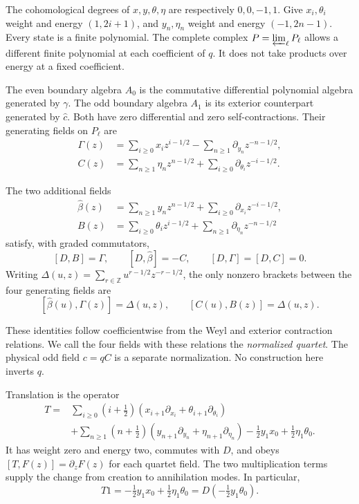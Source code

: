 The cohomological degrees of $x,y,\theta,\eta$ are respectively
$0,0,-1,1$. Give $x_i,\theta_i$ weight and energy
$(1,2i+1)$, and $y_n,\eta_n$ weight and energy $(-1,2n-1)$.
Every state is a finite polynomial. The complete complex
$P=\varprojlim_\ell P_\ell$ allows a different finite polynomial
at each coefficient of $q$. It does not take products over
energy at a fixed coefficient.

The even boundary algebra $A_0$ is the commutative differential
polynomial algebra generated by $\gamma$. The odd boundary
algebra $A_1$ is its exterior counterpart generated by
$\widehat c$. Both have zero differential and zero
self-contractions. Their generating fields on $P_\ell$ are
\begin{align*}
 \Gamma(z)&=\sum_{i\geq0}x_i z^{i-1/2}
                   -\sum_{n\geq1}\partial_{y_n}z^{-n-1/2},\\
 C(z)&=\sum_{n\geq1}\eta_n z^{n-1/2}
                   +\sum_{i\geq0}\partial_{\theta_i}z^{-i-1/2}.
\end{align*}

The two additional fields
\begin{align*}
 \widehat\beta(z)&=\sum_{n\geq1}y_n z^{n-1/2}
                   +\sum_{i\geq0}\partial_{x_i}z^{-i-1/2},\\
 B(z)&=\sum_{i\geq0}\theta_i z^{i-1/2}
                   +\sum_{n\geq1}\partial_{\eta_n}z^{-n-1/2}
\end{align*}
satisfy, with graded commutators,
\[
 [D,B]=\Gamma,\qquad [D,\widehat\beta]=-C,
 \qquad [D,\Gamma]=[D,C]=0.
\]
Writing
$\Delta(u,z)=\sum_{r\in\mathbb Z}u^{r-1/2}z^{-r-1/2}$,
the only nonzero brackets between the four generating fields
are
\[
 [\widehat\beta(u),\Gamma(z)]=\Delta(u,z),\qquad
 [C(u),B(z)]=\Delta(u,z).
\]

These identities follow coefficientwise from the Weyl and
exterior contraction relations. We call the four fields with
these relations the \emph{normalized quartet}. The physical
odd field $c=qC$ is a separate normalization. No construction
here inverts $q$.

Translation is the operator
\begin{align*}
 T={}&\sum_{i\geq0}(i+\tfrac12)
       (x_{i+1}\partial_{x_i}+\theta_{i+1}\partial_{\theta_i})\\
   &+\sum_{n\geq1}(n+\tfrac12)
       (y_{n+1}\partial_{y_n}+\eta_{n+1}\partial_{\eta_n})
       -\tfrac12y_1x_0+\tfrac12\eta_1\theta_0.
\end{align*}
It has weight zero and energy two, commutes with $D$, and obeys
$[T,F(z)]=\partial_zF(z)$ for each quartet field. The two
multiplication terms supply the change from creation to
annihilation modes. In particular,
\[
 T1=-\tfrac12y_1x_0+\tfrac12\eta_1\theta_0
        =D(-\tfrac12y_1\theta_0).
\]

